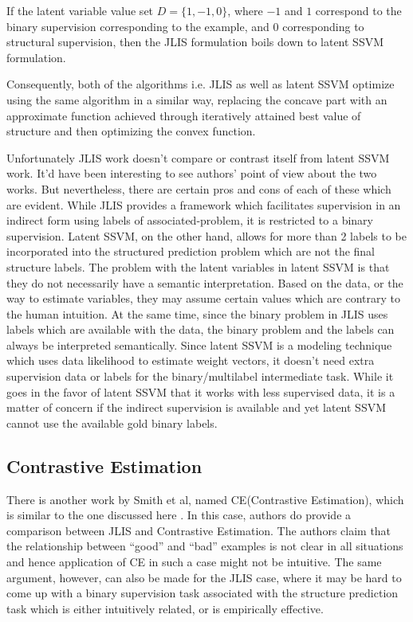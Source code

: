 \documentclass{acm_proc_article-sp}
\begin{document}
If the latent variable value set $D = \{1,-1,0\}$, where $-1$ and $1$ correspond to the binary supervision corresponding to the example, and $0$ corresponding to structural supervision, then the JLIS formulation boils down to latent SSVM formulation.

Consequently, both of the algorithms i.e. JLIS as well as latent SSVM optimize using the same algorithm in a similar way, replacing the concave part with an approximate function achieved through iteratively attained best value of structure and then optimizing the convex function.

Unfortunately JLIS work doesn't compare or contrast itself from latent SSVM work. It'd have been interesting to see authors' point of view about the two works. But nevertheless, there are certain pros and cons of each of these which are evident. While JLIS provides a framework which facilitates supervision in an indirect form using labels of associated-problem, it is restricted to a binary supervision. Latent SSVM, on the other hand, allows for more than 2 labels to be incorporated into the structured prediction problem which are not the final structure labels. The problem with the latent variables in latent SSVM is that they do not necessarily have a semantic interpretation. Based on the data, or the way to estimate variables, they may assume certain values which are contrary to the human intuition. At the same time, since the binary problem in JLIS uses labels which are available with the data, the binary problem and the labels can always be interpreted semantically. Since latent SSVM is a modeling technique which uses data likelihood to estimate weight vectors, it doesn't need extra supervision data or labels for the binary/multilabel intermediate task. While it goes in the favor of latent SSVM that it works with less supervised data, it is a matter of concern if the indirect supervision is available and yet latent SSVM cannot use the available gold binary labels.

\subsection{Contrastive Estimation}
\label{subsec:contrastive-estimation}
There is another work by Smith et al, named CE(Contrastive Estimation), which is similar to the one discussed here \cite{contrastive}. In this case, authors do provide a comparison between JLIS and Contrastive Estimation. The authors claim that the relationship between ``good'' and ``bad'' examples is not clear in all situations and hence application of CE in such a case might not be intuitive. The same argument, however, can also be made for the JLIS case, where it may be hard to come up with a binary supervision task associated with the structure prediction task which is either intuitively related, or is empirically effective.
\end{document}
